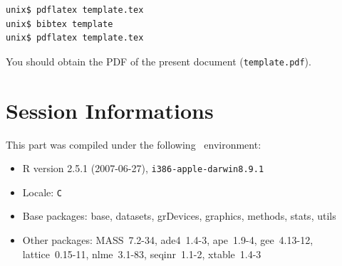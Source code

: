 \documentclass{article}
\begin{document}
\begin{verbatim}
unix$ pdflatex template.tex
unix$ bibtex template
unix$ pdflatex template.tex
\end{verbatim}

You should obtain the PDF of the present document (\texttt{template.pdf}).



\section{Session Informations}

This part was compiled under the following \Rlogo{}~environment:

\begin{itemize}
  \item R version 2.5.1 (2007-06-27), \verb|i386-apple-darwin8.9.1|
  \item Locale: \verb|C|
  \item Base packages: base, datasets, grDevices, graphics, methods,
    stats, utils
  \item Other packages: MASS~7.2-34, ade4~1.4-3, ape~1.9-4,
    gee~4.13-12, lattice~0.15-11, nlme~3.1-83, seqinr~1.1-2,
    xtable~1.4-3
\end{itemize}

\clearpage
{}


\end{document}
